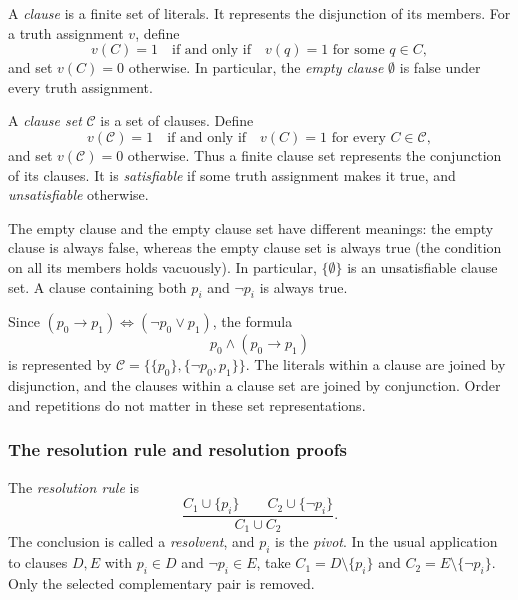 \documentclass[11pt,a4paper]{amsart}
\begin{document}
\begin{definition}[Clause]
  A \emph{clause} is a finite set of literals. It represents the disjunction
  of its members. For a truth assignment \(v\), define
  \[
    v(C)=1 \quad\text{if and only if}\quad
    v(q)=1\text{ for some }q\in C,
  \]
  and set \(v(C)=0\) otherwise. In particular, the \emph{empty clause}
  \(\emptyset\) is false under every truth assignment.
\end{definition}

\begin{definition}
  A \emph{clause set} \(\mathcal C\) is a set of clauses. Define
  \[
    v(\mathcal C)=1 \quad\text{if and only if}\quad
    v(C)=1\text{ for every }C\in\mathcal C,
  \]
  and set \(v(\mathcal C)=0\) otherwise. Thus a finite clause set represents
  the conjunction of its clauses. It is \emph{satisfiable} if some truth
  assignment makes it true, and \emph{unsatisfiable} otherwise.
\end{definition}

\begin{remark}
  The empty clause and the empty clause set have different meanings:
  the empty clause is always false, whereas the empty clause set is always
  true (the condition on all its members holds vacuously). In particular,
  \(\{\emptyset\}\) is an unsatisfiable clause set.
  A clause containing both \(p_i\) and \(\neg p_i\) is always true.
\end{remark}

\begin{example}
  Since \((p_0\rightarrow p_1)\Leftrightarrow(\neg p_0\lor p_1)\), the formula
  \[
    p_0\land(p_0\rightarrow p_1)
  \]
  is represented by \(\mathcal C=\{\{p_0\},\{\neg p_0,p_1\}\}\).
  The literals within a clause are joined by disjunction, and the clauses
  within a clause set are joined by conjunction. Order and repetitions do
  not matter in these set representations.
\end{example}

\subsubsection{The resolution rule and resolution proofs}

\begin{definition}
  The \emph{resolution rule} is
  \[
    \frac{C_1\cup\{p_i\}\qquad C_2\cup\{\neg p_i\}}{C_1\cup C_2}.
  \]
  The conclusion is called a \emph{resolvent}, and \(p_i\) is the
  \emph{pivot}. In the usual application to clauses \(D,E\) with
  \(p_i\in D\) and \(\neg p_i\in E\), take
  \(C_1=D\setminus\{p_i\}\) and \(C_2=E\setminus\{\neg p_i\}\).
  Only the selected complementary pair is removed.
\end{definition}
\end{document}
